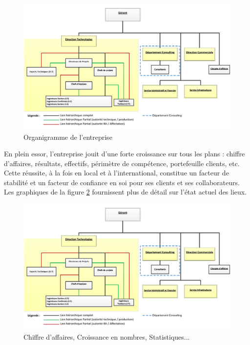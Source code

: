 \begin{spacing}{1.5}
\begin{figure}[h]
\centering
\includegraphics[scale=0.8]{organigramme.png}
\caption{Organigramme de l'entreprise}
\label{fig:organigramme}
\end{figure}

En plein essor, l'entreprise jouit d'une forte croissance sur tous les plans : chiffre d'affaires, résultats, effectifs, périmètre de compétence, portefeuille clients, etc. Cette réussite, à la fois en local et à l'international, constitue un facteur de stabilité et un facteur de confiance en soi pour ses clients et ses collaborateurs. Les graphiques de la figure \ref{statistiquesCroissance} fournissent plus de détail sur l'état actuel des lieux.\\

\begin{figure}[h]
\centering
\includegraphics[scale=0.8]{organigramme.png}
\caption{Chiffre d'affaires, Croissance en nombres, Statistiques...}
\label{statistiquesCroissance}
\end{figure}


\end{spacing}
